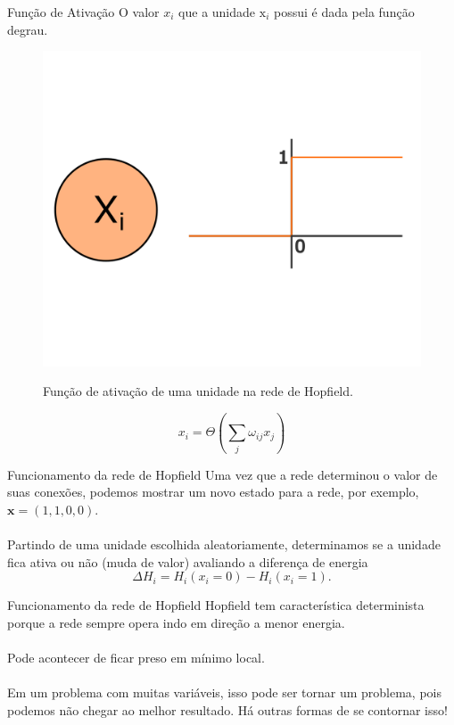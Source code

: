 \begin{frame}{Função de Ativação}%
  \justifying%
  O valor $x_{i}$ que a unidade $\mathrm{x}_{i}$ possui é dada pela função degrau.
  \begin{figure}[h]{}%
    \label{fig:hopfield-step}%
    \includegraphics[scale=0.35]{images/hopfield_activation.png}
    \caption{Função de ativação de uma unidade na rede de Hopfield.}
  \end{figure}
  \begin{equation}%
    \label{eq:step-function}
    x_{i} = \Theta \left(\sum_{j} \omega_{ij} x_{j} \right)
  \end{equation}
\end{frame}

\begin{frame}{Funcionamento da rede de Hopfield}%
  \justifying%
  Uma vez que a rede determinou o valor de suas conexões, podemos mostrar um novo estado para a rede, por exemplo, $\mathrm{\mathbf{x}} = (1, 1, 0, 0)$.
  \\~\\
  Partindo de uma unidade escolhida aleatoriamente, determinamos se a unidade fica ativa ou não (muda de valor) avaliando a diferença de energia 
  \begin{equation}%
    \label{eq:energy-delta}%
    \Delta H_{i} = H_{i}(x_{i} = 0) - H_{i}(x_{i} = 1). 
  \end{equation}

\end{frame}

\begin{frame}{Funcionamento da rede de Hopfield}%
  Hopfield tem característica determinista porque a rede sempre opera indo em direção a menor energia.
  \\~\\
  Pode acontecer de ficar preso em mínimo local.
  \\~\\
  Em um problema com muitas variáveis, isso pode ser tornar um problema, pois podemos não chegar ao melhor resultado. Há outras formas de se contornar isso!
\end{frame}
